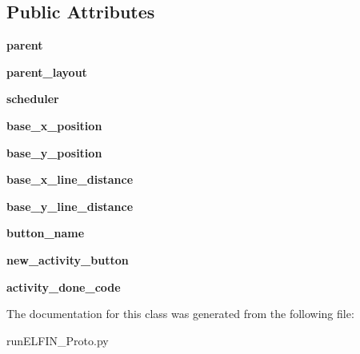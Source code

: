 \subsection*{Public Attributes}
\begin{DoxyCompactItemize}
\item 
\hypertarget{classrunELFIN__Proto_1_1AddActivityDialog_a12140c8cdceb2058b09160f7c7aab592}{{\bfseries parent}}\label{classrunELFIN__Proto_1_1AddActivityDialog_a12140c8cdceb2058b09160f7c7aab592}

\item 
\hypertarget{classrunELFIN__Proto_1_1AddActivityDialog_a7c13e3ec59ccf680918b02899fe94660}{{\bfseries parent\-\_\-layout}}\label{classrunELFIN__Proto_1_1AddActivityDialog_a7c13e3ec59ccf680918b02899fe94660}

\item 
\hypertarget{classrunELFIN__Proto_1_1AddActivityDialog_a896da045d7da424e13a0c7505d186965}{{\bfseries scheduler}}\label{classrunELFIN__Proto_1_1AddActivityDialog_a896da045d7da424e13a0c7505d186965}

\item 
\hypertarget{classrunELFIN__Proto_1_1AddActivityDialog_aa0a22cfdc9dca4b2220d3923d6c221fa}{{\bfseries base\-\_\-x\-\_\-position}}\label{classrunELFIN__Proto_1_1AddActivityDialog_aa0a22cfdc9dca4b2220d3923d6c221fa}

\item 
\hypertarget{classrunELFIN__Proto_1_1AddActivityDialog_aea0b78ce5f90cb87257f35789943b4ff}{{\bfseries base\-\_\-y\-\_\-position}}\label{classrunELFIN__Proto_1_1AddActivityDialog_aea0b78ce5f90cb87257f35789943b4ff}

\item 
\hypertarget{classrunELFIN__Proto_1_1AddActivityDialog_a727e08a9d43c339ec2215bf86c9930ad}{{\bfseries base\-\_\-x\-\_\-line\-\_\-distance}}\label{classrunELFIN__Proto_1_1AddActivityDialog_a727e08a9d43c339ec2215bf86c9930ad}

\item 
\hypertarget{classrunELFIN__Proto_1_1AddActivityDialog_a8715c0edf9b15b098652d7fd53620605}{{\bfseries base\-\_\-y\-\_\-line\-\_\-distance}}\label{classrunELFIN__Proto_1_1AddActivityDialog_a8715c0edf9b15b098652d7fd53620605}

\item 
\hypertarget{classrunELFIN__Proto_1_1AddActivityDialog_a1e40557c0232af6ed9a6b4ed521733e5}{{\bfseries button\-\_\-name}}\label{classrunELFIN__Proto_1_1AddActivityDialog_a1e40557c0232af6ed9a6b4ed521733e5}

\item 
\hypertarget{classrunELFIN__Proto_1_1AddActivityDialog_ad590f8758e4a758c93da452d1cdd3e36}{{\bfseries new\-\_\-activity\-\_\-button}}\label{classrunELFIN__Proto_1_1AddActivityDialog_ad590f8758e4a758c93da452d1cdd3e36}

\item 
\hypertarget{classrunELFIN__Proto_1_1AddActivityDialog_ab4d5fd476d1cfe92c13116bdc22b18af}{{\bfseries activity\-\_\-done\-\_\-code}}\label{classrunELFIN__Proto_1_1AddActivityDialog_ab4d5fd476d1cfe92c13116bdc22b18af}

\end{DoxyCompactItemize}


The documentation for this class was generated from the following file\-:\begin{DoxyCompactItemize}
\item 
run\-E\-L\-F\-I\-N\-\_\-\-Proto.\-py\end{DoxyCompactItemize}
